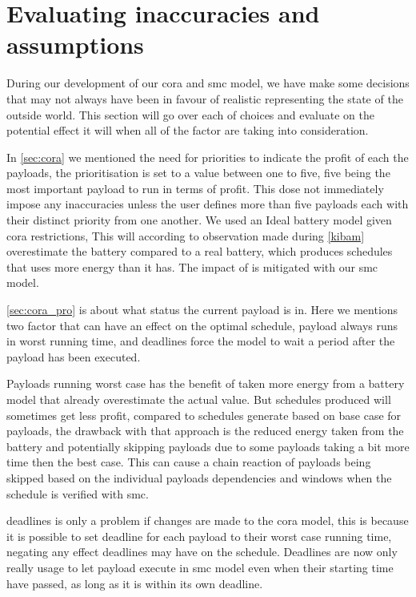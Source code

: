 \section{Evaluating inaccuracies and assumptions}
During our development of our \gls{cora} and \gls{smc} model, we have make some decisions that may not always have been in favour of realistic representing the state of the outside world. This section will go over each of choices and evaluate on the potential effect it will when all of the factor are taking into consideration.

In \cref{sec:cora} we mentioned the need for priorities to indicate the profit of each the payloads, the prioritisation is set to a value between one to five, five being the most important payload to run in terms of profit. This dose not immediately impose any inaccuracies unless the user defines more than five payloads each with their distinct priority from one another.
We used an Ideal battery model given \gls{cora} restrictions, This will according to observation made during \cref{kibam} overestimate the battery compared to a real battery, which produces schedules that uses more energy than it has. The impact of is mitigated with our \gls{smc} model.

\cref{sec:cora_pro} is about what status the current payload is in. Here we mentions two factor that can have an effect on the optimal schedule, payload always runs in worst running time, and deadlines force the model to wait a period after the payload has been executed. 

Payloads running worst case has the benefit of taken more energy from a battery model that already overestimate the actual value. But schedules produced will sometimes get less profit, compared to schedules generate based on base case for payloads, the drawback with that approach is the reduced energy taken from the battery and potentially skipping payloads due to some payloads taking a bit more time then the best case. This can cause a chain reaction of payloads being skipped based on the individual payloads dependencies and windows when the schedule is verified with \gls{smc}.

deadlines is only a problem if changes are made to the \gls{cora} model, this is because it is possible to set deadline for each payload to their worst case running time, negating any effect deadlines may have on the schedule. Deadlines are now only really usage to let payload execute in \gls{smc} model even when their starting time have passed, as long as it is within its own deadline.

